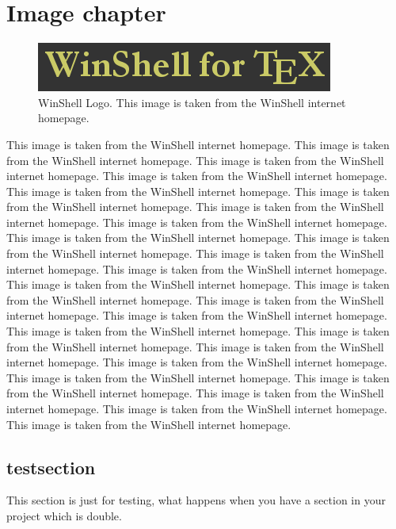 \chapter{Image chapter}
\label{chap3}
\thispagestyle{empty}
 
\begin{figure}
 \centering\includegraphics[]{Figures/winshell}
 \caption[WinShell Logo]{ 
 WinShell Logo.
 This image is taken from the WinShell internet homepage.
 } \label{pic_winshell}
\end{figure}

This image is taken from the WinShell internet homepage.
This image is taken from the WinShell internet homepage.
This image is taken from the WinShell internet homepage.
This image is taken from the WinShell internet homepage.
This image is taken from the WinShell internet homepage.
This image is taken from the WinShell internet homepage.
This image is taken from the WinShell internet homepage.
This image is taken from the WinShell internet homepage.
This image is taken from the WinShell internet homepage.
This image is taken from the WinShell internet homepage.
This image is taken from the WinShell internet homepage.
This image is taken from the WinShell internet homepage.
This image is taken from the WinShell internet homepage.
This image is taken from the WinShell internet homepage.
This image is taken from the WinShell internet homepage.
This image is taken from the WinShell internet homepage.
This image is taken from the WinShell internet homepage.
This image is taken from the WinShell internet homepage.
This image is taken from the WinShell internet homepage.
This image is taken from the WinShell internet homepage.
This image is taken from the WinShell internet homepage.
This image is taken from the WinShell internet homepage.
This image is taken from the WinShell internet homepage.
This image is taken from the WinShell internet homepage.
This image is taken from the WinShell internet homepage.

\section{testsection}

This section is just for testing, what happens when you have
a section in your project which is double.